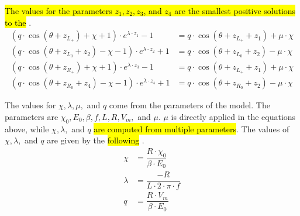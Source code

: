 \hl{The values for the parameters $z_1, z_2, z_3$, and $z_4$ are the smallest positive solutions to the }.
\begin{subequations}
	\begin{align}
		(q \cdot \cos(\theta + z_{L_+}) + \chi + 1) \cdot e^{\lambda \cdot z_1} - 1
		 & = q \cdot  \cos(\theta + z_{L_+} + z_1) + \mu \cdot \chi \label{equ:setup.og.def.impl.2.A} \\
		(q \cdot \cos(\theta + z_{L_0} + z_2) - \chi - 1) \cdot e^{\lambda \cdot z_2} + 1
		 & = q \cdot  \cos(\theta + z_{L_0} + z_2) - \mu \cdot \chi                                   \\
		(q \cdot \cos(\theta + z_{R_+}) + \chi + 1) \cdot e^{\lambda \cdot z_3} - 1
		 & = q \cdot  \cos(\theta + z_{L_+} + z_1) + \mu \cdot \chi                                   \\
		(q \cdot \cos(\theta + z_{R_0} + z_4) - \chi - 1) \cdot e^{\lambda \cdot z_4} + 1
		 & = q \cdot  \cos(\theta + z_{R_0} + z_2) - \mu \cdot \chi \label{equ:setup.og.def.impl.2.D}
	\end{align}
\end{subequations}

The values for $\chi, \lambda, \mu,$ and $q$ come from the parameters of the model.
The parameters are $\chi_0, E_0, \beta, f, L, R, V_m,$ and $\mu$.
$\mu$ is directly applied in the equations above, while $\chi, \lambda,$ and $q$ \hl{are computed from multiple parameters}.
The values of $\chi, \lambda,$ and $q$ are given by the \hl{following }.
\begin{subequations}
	\begin{align}
		\chi    & = \dfrac{R \cdot \chi_0}{\beta \cdot E_0} \label{equ:setup.og.def.param.chi} \\
		\lambda & = \dfrac{-R}{L \cdot 2 \cdot \pi \cdot f}                                    \\
		q       & = \dfrac{R \cdot V_m}{\beta \cdot E_0} \label{equ:setup.og.def.param.q}
	\end{align}
\end{subequations}
